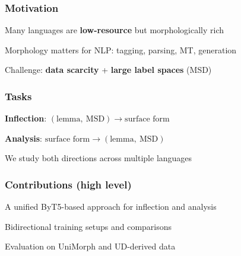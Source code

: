 
\begin{frame}
    \frametitle{Motivation}
    \begin{PraesentationAufzaehlung}
        \item Many languages are \textbf{low-resource} but morphologically rich
        \item Morphology matters for NLP: tagging, parsing, MT, generation
        \item Challenge: \textbf{data scarcity} + \textbf{large label spaces} (MSD)
    \end{PraesentationAufzaehlung}
\end{frame}

\begin{frame}
    \frametitle{Tasks}
    \begin{PraesentationAufzaehlung}
        \item \textbf{Inflection}: $(\text{lemma},\ \text{MSD}) \rightarrow \text{surface form}$
        \item \textbf{Analysis}: $\text{surface form} \rightarrow (\text{lemma},\ \text{MSD})$
        \item We study both directions across multiple languages
    \end{PraesentationAufzaehlung}
\end{frame}

\begin{frame}
    \frametitle{Contributions (high level)}
    \begin{PraesentationAufzaehlung}
        \item A unified ByT5-based approach for inflection and analysis
        \item Bidirectional training setups and comparisons
        \item Evaluation on UniMorph and UD-derived data
    \end{PraesentationAufzaehlung}
\end{frame}
